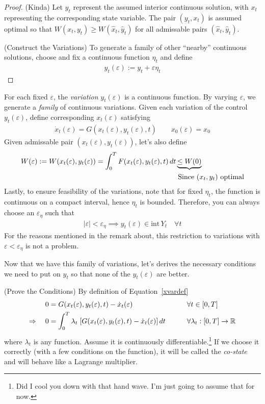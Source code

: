 \documentclass[12pt]{article}
\numberwithin{equation}{section} %
\theoremstyle{plain}
\theoremstyle{definition}
\theoremstyle{remark}
\newcommand{\R}{\mathbb{R}}
\begin{document}
\begin{proof}{(Kinda)}
Let $y_t$ represent the assumed interior continuous solution, with $x_t$
representing the corresponding state variable. The pair $(y_t,x_t)$ is
assumed optimal so that $W(x_t,y_t) \geq W(\hat{x}_t,\hat{y}_t)$ for all
admissable pairs $(\hat{x}_t,\hat{y}_t)$.

(Construct the Variations)
To generate a family of other ``nearby'' continuous solutions, choose
and fix a continuous function $\eta_t$ and define
\begin{align*}
  y_t(\varepsilon) := y_t + \varepsilon\eta_t
\end{align*}
\end{proof}
For each fixed $\varepsilon$, the \emph{variation} $y_t(\varepsilon)$ is
a continuous function. By varying $\varepsilon$, we generate a
\emph{family} of continuous variations. Given each variation of the
control $y_t(\varepsilon)$, define corresponding $x_t(\varepsilon)$
satisfying
\begin{align}
  \dot{x}_t(\varepsilon)
  = G(x_t(\varepsilon), y_t(\varepsilon), t)
  \qquad x_0(\varepsilon)=x_0
  \label{xvardef}
\end{align}
Given admissable pair $(x_t(\varepsilon), y_t(\varepsilon))$, let's also
define
\begin{align}
  W(\varepsilon) := W(x_t(\varepsilon), y_t(\varepsilon))
  = \int^{T}_0 F(x_t(\varepsilon), y_t(\varepsilon), t) \, dt
  &\underbrace{\leq W(0)} \label{Weps} \\
  &\;\text{Since $(x_t,y_t)$ optimal}
  \notag
\end{align}
Lastly, to ensure feasibility of the variations, note that for fixed
$\eta_t$, the function is continuous on a compact interval, hence
$\eta_t$ is bounded.  Therefore, you can always choose an
$\varepsilon_\eta$ such that
\begin{align*}
  |\varepsilon| < \varepsilon_\eta
  \implies
  y_t(\varepsilon) \in \text{int} \, Y_t \quad\forall t
\end{align*}
For the reasons mentioned in the remark about, this restriction to
variations with $\varepsilon<\varepsilon_\eta$ is not a problem.

Now that we have this family of variations, let's derives the necessary
conditions we need to put on $y_t$ so that none of the
$y_t(\varepsilon)$ are better.

(Prove the Conditions)
By definition of Equation~\ref{xvardef}
\begin{alignat}{3}
  0 &= G(x_t(\varepsilon), y_t(\varepsilon), t) - \dot{x}_t(\varepsilon)
  &&\forall t\in[0,T] \notag \\
  \Rightarrow \quad
  0 &= \int^{T}_0
  \lambda_t \; [
    G(x_t(\varepsilon), y_t(\varepsilon), t) -
    \dot{x}_t(\varepsilon)
  ] \, dt
  \qquad&&\forall \lambda_t:[0,T]\rightarrow \R
  \label{lambdadef}
\end{alignat}
where $\lambda_t$ is any function. Assume it is continuously
differentiable.\footnote{%
Did I cool you down with that hand wave. I'm just going to assume that
for now.}
If we choose it correctly (with a few conditions on the function), it
will be called the \emph{co-state} and will behave like a Lagrange
multiplier.
\end{document}
